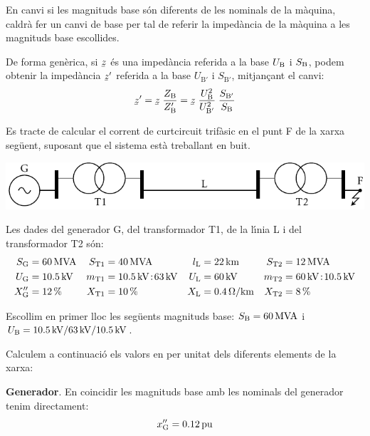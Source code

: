  En canvi si les magnituds base s\'{o}n diferents de les nominals de la m\`{a}quina, caldr\`{a} fer un canvi de base per tal de referir la imped\`{a}ncia de la m\`{a}quina a les magnituds base escollides.

De forma gen\`{e}rica, si $\cmplx{z}$ \'{e}s una imped\`{a}ncia referida a la base $U_\mathrm{B}$ i $S_\mathrm{B}$, podem obtenir la imped\`{a}ncia $\cmplx{z}'$ referida a la base $U_{\text{B}'}$ i $S_{\text{B}'}$, mitjan\c{c}ant el canvi:
\begin{equation}
   \cmplx{z}' = \cmplx{z} \; \frac{Z\ped{B}}{Z\ped{B}'} = \cmplx{z} \; \frac{U\ped{B}^2}{U_{\text{B}'}^2} \; \frac{S_{\text{B}'}}{S\ped{B}}\label{eq_pu_canvi_base}
\end{equation}

\begin{exemple}
    Es tracte de calcular el corrent de curtcircuit trif\`{a}sic en el punt F de la xarxa seg\"{u}ent, suposant
    que el sistema est\`{a} treballant en buit.
    \begin{center}
        \includegraphics{Imatges/Cap-Fonaments-pu-Circuit1.pdf}
    \end{center}

    Les dades del generador G, del transformador T1, de la l\'{\i}nia L i del transformador T2 s\'{o}n:
    \begin{align*}
       S_\mathrm{G} &= \SI{60}{MVA} & S_\mathrm{T1} &= \SI{40}{MVA} & l_\mathrm{L} &= \SI{22}{km} & S_\mathrm{T2} &=
       \SI{12}{MVA} \\
       U_\mathrm{G} &= \SI{10,5}{kV} & m_\mathrm{T1} &= \SI{10,5}{kV}\!:\!\SI{63}{kV} & U_\mathrm{L} &= \SI{60}{kV} & m_\mathrm{T2} &= \SI{60}{kV}\!:\!\SI{10,5}{kV} \\
       X''_\mathrm{G} &= \SI{12}{\%} & X_\mathrm{T1} &= \SI{10}{\%} & X_\mathrm{L} &= \SI{0,4}{\ensuremath{\mathrm{\Omega}}/km} & X_\mathrm{T2} &= \SI{8}{\%}
    \end{align*}

    Escollim en primer lloc les seg\"{u}ents magnituds base: $S_\mathrm{B} = \SI{60}{MVA}$ i $U_\mathrm{B}
    = \SI{10,5}{kV} / \SI{63}{kV} / \SI{10,5}{kV}$.

    Calculem a continuaci\'{o} els valors en per unitat dels diferents elements de la xarxa:

    \textbf{Generador}. En coincidir les magnituds base amb les nominals del generador tenim
     directament:
    \[
    x''_\mathrm{G} = \SI{0,12}{pu}
    \]


\end{exemple}
